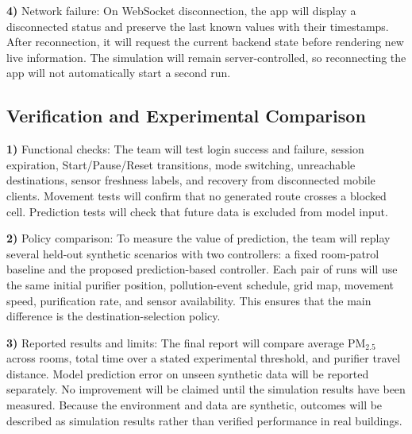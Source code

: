 \documentclass[conference]{IEEEtran}
\begin{document}
\par\noindent\textbf{4)} Network failure:
On WebSocket disconnection, the app will display a disconnected status and preserve the last known values with their timestamps. After reconnection, it will request the current backend state before rendering new live information. The simulation will remain server-controlled, so reconnecting the app will not automatically start a second run.

\subsection{Verification and Experimental Comparison}
\par\noindent\textbf{1)} Functional checks:
The team will test login success and failure, session expiration, Start/Pause/Reset transitions, mode switching, unreachable destinations, sensor freshness labels, and recovery from disconnected mobile clients. Movement tests will confirm that no generated route crosses a blocked cell. Prediction tests will check that future data is excluded from model input.

\par\noindent\textbf{2)} Policy comparison:
To measure the value of prediction, the team will replay several held-out synthetic scenarios with two controllers: a fixed room-patrol baseline and the proposed prediction-based controller. Each pair of runs will use the same initial purifier position, pollution-event schedule, grid map, movement speed, purification rate, and sensor availability. This ensures that the main difference is the destination-selection policy.

\par\noindent\textbf{3)} Reported results and limits:
The final report will compare average PM$_{2.5}$ across rooms, total time over a stated experimental threshold, and purifier travel distance. Model prediction error on unseen synthetic data will be reported separately. No improvement will be claimed until the simulation results have been measured. Because the environment and data are synthetic, outcomes will be described as simulation results rather than verified performance in real buildings.
\end{document}
